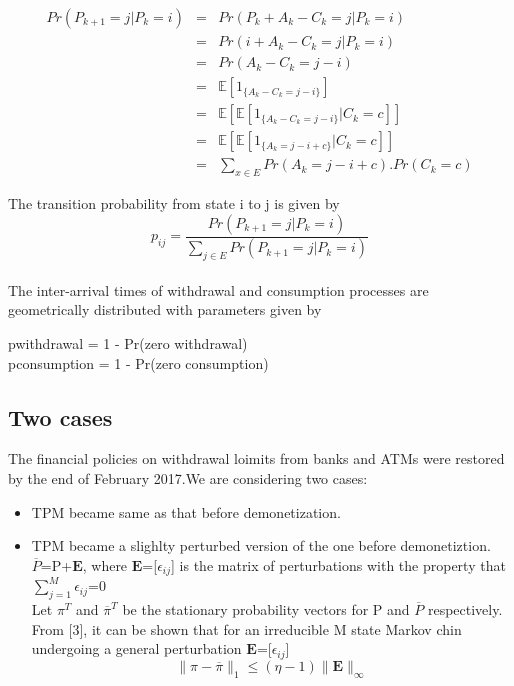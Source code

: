 \documentclass[12pt]{article}
\begin{document}
\begin{eqnarray}
Pr(P_{k+1} = j | P_{k} = i)&=&Pr(P_{k} + A_{k} - C_{k} = j | P_{k} = i) \\
&=&Pr(  i + A_{k} - C_{k} = j | P_{k}  = i)\\
&=&Pr(  A_{k} - C_{k} = j-i )\\
&=&\mathbb{E} [ 1_{\lbrace A_{k} - C_{k} = j-i \rbrace} ] \\
&=&\mathbb{E}[\mathbb{E} [ 1_{\lbrace A_{k} - C_{k} = j-i \rbrace}|C_{k} = c ] ]\\
&=&\mathbb{E}[\mathbb{E}[1_{\lbrace A_{k} = j-i+c \rbrace}|C_{k} = c ]] \\
&=&\sum_{x\in\textit{E}} Pr(A_{k} = j-i+c).Pr(C_{k} = c)
\end{eqnarray}

The transition probability from state i to j is given by
\begin{equation}
p_{ij} = \frac{Pr(P_{k+1} = j | P_{k} = i)}{\sum_{j\in\textit{E}}Pr(P_{k+1} = j | P_{k} = i)}
\end{equation}

\paragraph{}
The inter-arrival times of withdrawal and consumption processes are geometrically distributed with parameters given by
\begin{center}
 pwithdrawal = 1 - Pr(zero withdrawal)\\
 pconsumption = 1 - Pr(zero consumption)
\end{center}
\subsection{Two cases}
The financial policies on withdrawal loimits from banks and ATMs were restored by the end of February 2017.We are considering two cases:\\
\begin{itemize}
	\item TPM became same as that before demonetization. 
	\item TPM became a slighlty perturbed version of the one before demonetiztion. \\
	$\overline{P}$=P+$\textbf{E}$, \hspace{2pt} where $\textbf{E}$=[$\epsilon_{ij}$] is the matrix of perturbations with the property that $\sum_{j=1}^{M}\epsilon_{ij}$=0\\
	Let $\pi^{T}$ and $\overline{\pi}^{T}$ be the stationary probability vectors for P and $\overline{P}$ respectively.\\
	From [3], it can be shown that for an irreducible M state Markov chin undergoing a general perturbation $\textbf{E}$=[$\epsilon_{ij}$]\\
	\begin{equation}
		\| \pi - \overline{\pi}\|_{1} \leq (\eta-1)\|\textbf{E}\|_{\infty}
	\end{equation}
\end{itemize}
\end{document}
